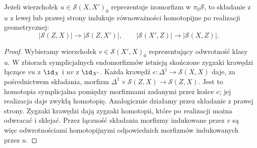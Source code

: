 \begin{stwierdzenie}\label{cat:prop:dk-mapping-invariance}
Jeżeli wierzchołek $u\in\mathcal S(X,X')_0$ reprezentuje izomorfizm w $\pi_0\mathcal S$, to składanie z $u$ z lewej lub prawej strony indukuje równoważności homotopijne po realizacji geometrycznej:
\[
 |\mathcal S(Z,X)|\longrightarrow|\mathcal S(Z,X')|,
 \qquad
 |\mathcal S(X',Z)|\longrightarrow|\mathcal S(X,Z)|.
\]
\end{stwierdzenie}
\begin{proof}
Wybieramy wierzchołek $v\in\mathcal S(X',X)_0$ reprezentujący odwrotność klasy $u$. W zbiorach symplicjalnych endomorfizmów istnieją skończone zygzaki krawędzi łączące $vu$ z $\id_X$ i $uv$ z $\id_{X'}$. Każda krawędź $e:\Delta^1\to\mathcal S(X,X)$ daje, za pośrednictwem składania, morfizm $\Delta^1\times\mathcal S(Z,X)\to\mathcal S(Z,X)$. Jest to homotopia symplicjalna pomiędzy morfizmami zadanymi przez końce $e$; jej realizacja daje zwykłą homotopię. Analogicznie działamy przez składanie z prawej strony. Zygzaki krawędzi dają zygzaki homotopii, które po realizacji można odwracać i sklejać. Przez łączność składania morfizmy indukowane przez $v$ są więc odwrotnościami homotopijnymi odpowiednich morfizmów indukowanych przez $u$.
\end{proof}

